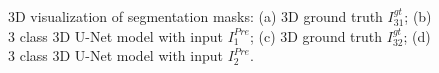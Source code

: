 \begin{figure}[!htb]
\centering
{}\hfil
{}

\hfil 
{}

\caption{3D visualization of segmentation masks: (a) 3D ground truth $I^{gt}_{31}$; (b) 3 class 3D U-Net model with input $I^{Pre}_1$; (c) 3D ground truth $I^{gt}_{32}$; (d) 3 class 3D U-Net model with input $I^{Pre}_2$.}

\label{fig:results-unet-3channel}

\end{figure}

